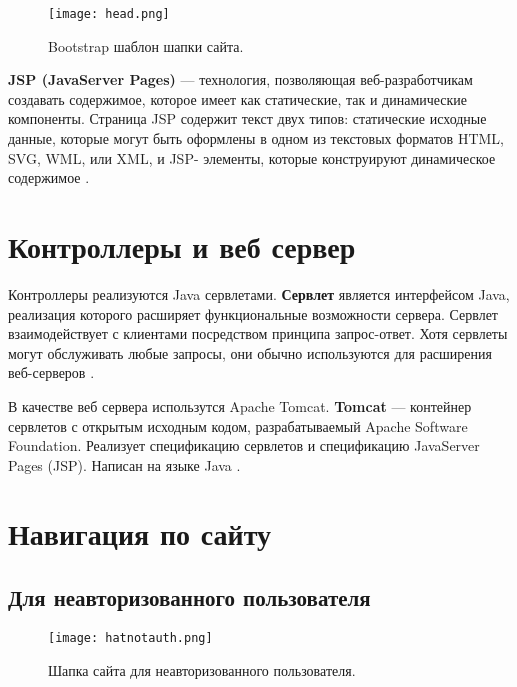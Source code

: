  

\begin{figure}[h]
  \centering
  \texttt{[image: head.png]}
  \caption{Bootstrap шаблон шапки сайта.}
\end{figure}

\textbf{JSP (JavaServer Pages)} — технология, позволяющая веб-разработчикам создавать содержимое, которое имеет как статические, так и динамические компоненты. Страница JSP содержит текст двух типов: статические исходные данные, которые могут быть оформлены в одном из текстовых форматов HTML, SVG, WML, или XML, и JSP- элементы, которые конструируют динамическое содержимое \cite{java-course-jsp}.

 


\section{Контроллеры и веб сервер}

Контроллеры реализуются Java сервлетами. \textbf{Сервлет} является интерфейсом Java, реализация которого расширяет функциональные возможности сервера. Сервлет взаимодействует с клиентами посредством принципа запрос-ответ. Хотя сервлеты могут обслуживать любые запросы, они обычно используются для расширения веб-серверов \cite{java-course-servlet}.

В качестве веб сервера использутся Apache Tomcat. \textbf{Tomcat} — контейнер сервлетов с открытым исходным кодом, разрабатываемый Apache Software Foundation. Реализует спецификацию сервлетов и спецификацию JavaServer Pages (JSP). Написан на языке Java \cite{wiki-tomcat}.



\section{Навигация по сайту} 

\subsection{Для неавторизованного пользователя} 

\begin{figure}[h]
  \centering
  \texttt{[image: hatnotauth.png]}
  \caption{ Шапка сайта для неавторизованного пользователя.}
\end{figure}

